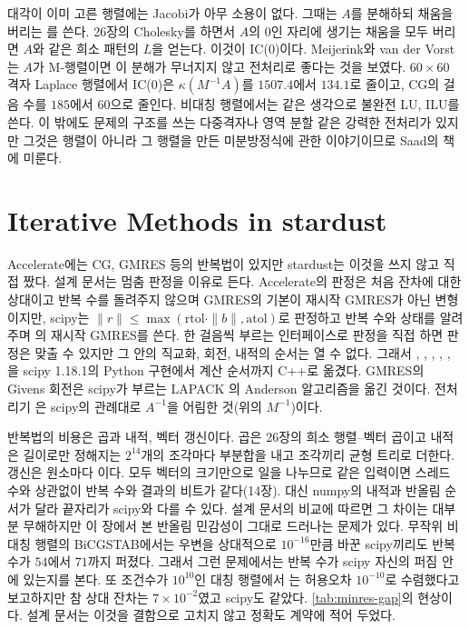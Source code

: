 대각이 이미 고른 행렬에는 Jacobi가 아무 소용이 없다. 그때는 $A$를 분해하되 채움을 버리는 를 쓴다. 26장의 Cholesky를 하면서 $A$의 $0$인 자리에 생기는 채움을 모두 버리면 $A$와 같은 희소 패턴의 $L$을 얻는다. 이것이  IC(0)이다. Meijerink와 van der Vorst는 $A$가 M-행렬이면 이 분해가 무너지지 않고 전처리로 좋다는 것을 보였다\cite{meijerink1977}. $60\times60$ 격자 Laplace 행렬에서 IC(0)은 $\kappa(M^{-1}A)$를 $1507.4$에서 $134.1$로 줄이고, CG의 걸음 수를 $185$에서 $60$으로 줄인다. 비대칭 행렬에서는 같은 생각으로 불완전 LU, ILU를 쓴다. 이 밖에도 문제의 구조를 쓰는 다중격자나 영역 분할 같은 강력한 전처리가 있지만 그것은 행렬이 아니라 그 행렬을 만든 미분방정식에 관한 이야기이므로 Saad의 책\cite{saad2003iterative}에 미룬다.

\section{Iterative Methods in stardust}
\label{sec:krylov-stardust}

\begin{instardust}
Accelerate에는 CG, GMRES 등의 반복법이 있지만 stardust는 이것을 쓰지 않고 직접 짰다. 설계 문서는 멈춤 판정을 이유로 든다. Accelerate의 판정은 처음 잔차에 대한 상대이고 반복 수를 돌려주지 않으며 GMRES의 기본이 재시작 GMRES가 아닌 변형이지만, scipy는 $\|r\|\le\max(\mathrm{rtol}\cdot\|b\|,\mathrm{atol})$로 판정하고 반복 수와 상태를 알려 주며 의 재시작 GMRES를 쓴다. 한 걸음씩 부르는 인터페이스로 판정을 직접 하면 판정은 맞출 수 있지만 그 안의 직교화, 회전, 내적의 순서는 열 수 없다. 그래서 , , , , , 을 scipy 1.18.1의 Python 구현에서 계산 순서까지 C++로 옮겼다. GMRES의 Givens 회전은 scipy가 부르는 LAPACK 의 Anderson 알고리즘을 옮긴 것이다. 전처리기 은 scipy의 관례대로 $A^{-1}$을 어림한 것(위의 $M^{-1}$)이다.
\end{instardust}

\begin{instardust}
반복법의 비용은 곱과 내적, 벡터 갱신이다. 곱은 26장의 희소 행렬--벡터 곱이고 내적은 길이로만 정해지는 $2^{14}$개의 조각마다 부분합을 내고 조각끼리 균형 트리로 더한다. 갱신은 원소마다 이다. 모두 벡터의 크기만으로 일을 나누므로 같은 입력이면 스레드 수와 상관없이 반복 수와 결과의 비트가 같다(14장). 대신 numpy의 내적과 반올림 순서가 달라 끝자리가 scipy와 다를 수 있다. 설계 문서의 비교에 따르면 그 차이는 대부분 무해하지만 이 장에서 본 반올림 민감성이 그대로 드러나는 문제가 있다. 무작위 비대칭 행렬의 BiCGSTAB에서는 우변을 상대적으로 $10^{-16}$만큼 바꾼 scipy끼리도 반복 수가 $54$에서 $71$까지 퍼졌다. 그래서 그런 문제에서는 반복 수가 scipy 자신의 퍼짐 안에 있는지를 본다. 또 조건수가 $10^{10}$인 대칭 행렬에서 는 허용오차 $10^{-10}$로 수렴했다고 보고하지만 참 상대 잔차는 $7\times10^{-2}$였고 scipy도 같았다. \cref{tab:minres-gap}의 현상이다. 설계 문서는 이것을 결함으로 고치지 않고 정확도 계약에 적어 두었다.
\end{instardust}

